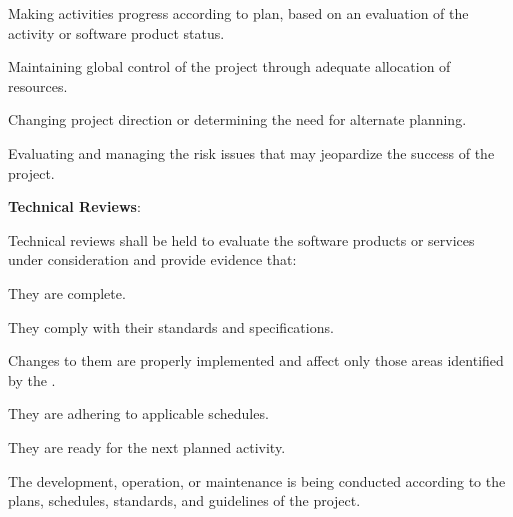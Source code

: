 \begin{adjustwidth}{2em}{0pt}
\begin{compactenum}
\begin{compactenum}
						\begin{compactenum}

							\item Making activities progress according to plan, based on an evaluation of the activity or software product
							status.

							\item Maintaining global control of the project through adequate allocation of resources.

							\item Changing project direction or determining the need for alternate planning.

							\item Evaluating and managing the risk issues that may jeopardize the success of the project.

						\end{compactenum}

					\end{compactenum}

					\item {\bf Technical Reviews}:

					\begin{compactenum}

						\item Technical reviews shall be held to evaluate the software products or services under consideration and provide evidence that:

						\begin{compactenum}

							\item They are complete.

							\item They comply with their standards and specifications.

							\item Changes to them are properly implemented and affect only those areas identified by the .

							\item They are adhering to applicable schedules.

							\item They are ready for the next planned activity.

							\item The development, operation, or maintenance is being conducted according to the plans, schedules, standards, and guidelines of the project.

						\end{compactenum}

					\end{compactenum}

				\end{compactenum}

			\end{adjustwidth}

